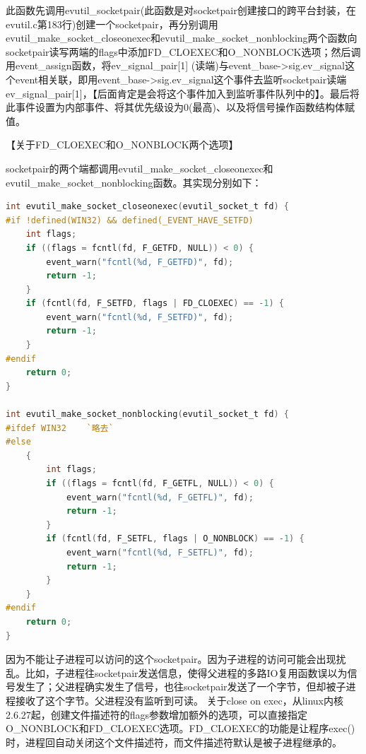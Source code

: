 \documentclass[11pt,a4paper]{article}
\begin{document}
此函数先调用evutil\_socketpair(此函数是对socketpair创建接口的跨平台封装，在evutil.c第183行)创建一个socketpair，再分别调用evutil\_make\_socket\_closeonexec和evutil\_make\_socket\_nonblocking两个函数向socketpair读写两端的flags中添加FD\_CLOEXEC和O\_NONBLOCK选项；然后调用event\_assign函数，将ev\_signal\_pair[1] (读端)与event\_base->sig.ev\_signal这个event相关联，即用event\_base->sig.ev\_signal这个事件去监听socketpair读端ev\_signal\_pair[1]，【后面肯定是会将这个事件加入到监听事件队列中的】。最后将此事件设置为内部事件、将其优先级设为0(最高)、以及将信号操作函数结构体赋值。

【关于FD\_CLOEXEC和O\_NONBLOCK两个选项】

socketpair的两个端都调用evutil\_make\_socket\_closeonexec和evutil\_make\_socket\_nonblocking函数。其实现分别如下：
\begin{lstlisting}[language=C]
int evutil_make_socket_closeonexec(evutil_socket_t fd) {
#if !defined(WIN32) && defined(_EVENT_HAVE_SETFD)
	int flags;
	if ((flags = fcntl(fd, F_GETFD, NULL)) < 0) {
		event_warn("fcntl(%d, F_GETFD)", fd);
		return -1;
	}
	if (fcntl(fd, F_SETFD, flags | FD_CLOEXEC) == -1) {
		event_warn("fcntl(%d, F_SETFD)", fd);
		return -1;
	}
#endif
	return 0;
}

int evutil_make_socket_nonblocking(evutil_socket_t fd) {
#ifdef WIN32	`略去`
#else
	{
		int flags;
		if ((flags = fcntl(fd, F_GETFL, NULL)) < 0) {
			event_warn("fcntl(%d, F_GETFL)", fd);
			return -1;
		}
		if (fcntl(fd, F_SETFL, flags | O_NONBLOCK) == -1) {
			event_warn("fcntl(%d, F_SETFL)", fd);
			return -1;
		}
	}
#endif
	return 0;
}
\end{lstlisting}

因为不能让子进程可以访问的这个socketpair。因为子进程的访问可能会出现扰乱。比如，子进程往socketpair发送信息，使得父进程的多路IO复用函数误以为信号发生了；父进程确实发生了信号，也往socketpair发送了一个字节，但却被子进程接收了这个字节。父进程没有监听到可读。
关于close on exec，从linux内核2.6.27起，创建文件描述符的flags参数增加额外的选项，可以直接指定O\_NONBLOCK和FD\_CLOEXEC选项。FD\_CLOEXEC的功能是让程序exec()时，进程回自动关闭这个文件描述符，而文件描述符默认是被子进程继承的。
\end{document}

